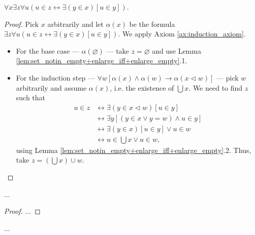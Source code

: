 \begin{theorem}
    \label{thm:exists_unionSet}
    \leanok
    $\forall x \exists z \forall u (u \in z \leftrightarrow \exists (y\in x)[u \in y])$.
\end{theorem}

\begin{proof}
    \leanok
    Pick $x$ arbitrarily and let $\alpha (x)$ be the formula $\exists z \forall u (u \in z \leftrightarrow \exists (y\in x)[u \in y])$.
    We apply Axiom \ref{ax:induction_axiom}.
    \begin{itemize}
        \item For the base case — $\alpha (\varnothing)$ — take $z=\varnothing$ and use Lemma \ref{lem:set_notin_empty+enlarge_iff+enlarge_empty}.1.
        \item For the induction step — $\forall w[\alpha(x) \land \alpha(w) \rightarrow \alpha(x \lhd w)]$ — 
        pick $w$ arbitrarily and assume $\alpha(x)$, i.e. the existence of $\bigcup x$.
        We need to find $z$ such that
        \begin{equation*}
        \begin{split}
            u \in z & \leftrightarrow \exists (y \in x \lhd w)[u \in y]\\
            & \leftrightarrow \exists y[(y \in x \lor y = w) \land u \in y]\\
            & \leftrightarrow \exists(y \in x)[u \in y] \lor u \in w\\
            & \leftrightarrow u \in \bigcup x \lor u \in w,
        \end{split}
        \end{equation*}
        using Lemma \ref{lem:set_notin_empty+enlarge_iff+enlarge_empty}.2. Thus, take $z = (\bigcup x) \cup w$.
    \end{itemize}
\end{proof}

\begin{theorem}
    \label{thm:comp_scheme}
    ...
\end{theorem}

\begin{proof}
    \leanok
    ...
\end{proof}

\begin{definition}
    \label{def:Intersection}
    ...
\end{definition}

